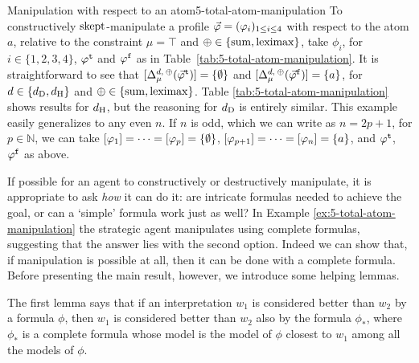 \begin{xmpl}{Manipulation with respect to an atom}{5-total-atom-manipulation}
	To constructively $\skept$-manipulate a profile 
	$\P=(\phi_i)_{1\le i \le 4}$ with respect to the atom $a$,
	relative to the constraint $\mu=\top$ and $\agg\in\set{\ssum,\leximax}$,
	take $\phi_i$, for $i\in\{1,2,3,4\}$, 
	$\truth{\phi}$ and $\manip{\phi}$ as in Table~\ref{tab:5-total-atom-manipulation}.
	It is straightforward to see that $\mods{\me^{\dd,\:\agg}_{\mu}(\truth{\P})}=\set{\emptyset}$
	and $\mods{\me^{\dd,\:\agg}_{\mu}(\manip{\P})}=\set{a}$, for $d\in\set{\dd_\drastic,\dd_\hamming}$
	and $\agg\in\set{\ssum,\leximax}$.
	Table \ref{tab:5-total-atom-manipulation} shows results for $\dd_\hamming$,
	but the reasoning for $\dd_\drastic$ is entirely similar. 
	This example easily generalizes to any even $n$.
	If $n$ is odd, which we can write as $n=2p+1$, for $p\in\mathbb{N}$, 
	we can take $\mods{\phi_1}=\dots=\mods{\phi_p}=\set{\emptyset}$,
	$\mods{\phi_{p+1}}=\dots=\mods{\phi_n}=\set{a}$, and $\truth{\phi}$, $\manip{\phi}$ as above.
\end{xmpl}

If possible for an agent to constructively or destructively manipulate, 
it is appropriate to ask \emph{how} it can do it: are intricate formulas needed to achieve the goal,
or can a `simple' formula work just as well? 
In Example \ref{ex:5-total-atom-manipulation} the strategic agent manipulates using complete formulas, 
suggesting that the answer lies with the second option.
Indeed we can show that, if manipulation is possible at all, then it can be done with a complete formula.
Before presenting the main result, however, 
we introduce some helping lemmas.

The first lemma says that if an interpretation $w_1$ is considered better than $w_2$
by a formula $\phi$,
then $w_1$ is considered better than $w_2$ also by the formula $\phi_{\ast}$,
where $\phi_{\ast}$ is a complete formula whose model is the model of $\phi$
closest to $w_1$ among all the models of $\phi$.

